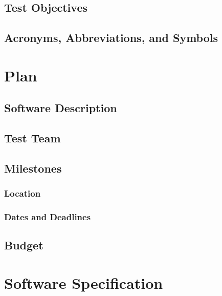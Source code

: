 \documentclass[12pt]{report}
\begin{document}
\section{Test Objectives}

\section{Acronyms, Abbreviations, and Symbols }

%
%

\chapter{Plan}

\section{Software Description}

\section{Test Team} 

\section{Milestones}

\subsection{Location}

\subsection{Dates and Deadlines}

\section{Budget}

%
%

\chapter{Software Specification}
\end{document}
